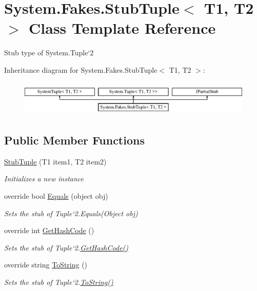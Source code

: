 \hypertarget{class_system_1_1_fakes_1_1_stub_tuple_3_01_t1_00_01_t2_01_4}{\section{System.\-Fakes.\-Stub\-Tuple$<$ T1, T2 $>$ Class Template Reference}
\label{class_system_1_1_fakes_1_1_stub_tuple_3_01_t1_00_01_t2_01_4}
}


Stub type of System.\-Tuple`2 


Inheritance diagram for System.\-Fakes.\-Stub\-Tuple$<$ T1, T2 $>$\-:\begin{figure}[H]
\begin{center}
\leavevmode
\includegraphics[height=1.704718cm]{class_system_1_1_fakes_1_1_stub_tuple_3_01_t1_00_01_t2_01_4}
\end{center}
\end{figure}
\subsection*{Public Member Functions}
\begin{DoxyCompactItemize}
\item 
\hyperlink{class_system_1_1_fakes_1_1_stub_tuple_3_01_t1_00_01_t2_01_4_a96c73b068f3b8f4f797e172dc0246e2d}{Stub\-Tuple} (T1 item1, T2 item2)
\begin{DoxyCompactList}\small\item\em Initializes a new instance\end{DoxyCompactList}\item 
override bool \hyperlink{class_system_1_1_fakes_1_1_stub_tuple_3_01_t1_00_01_t2_01_4_a41148edbc3779f77dd6fea37d72a7d82}{Equals} (object obj)
\begin{DoxyCompactList}\small\item\em Sets the stub of Tuple`2.Equals(\-Object obj)\end{DoxyCompactList}\item 
override int \hyperlink{class_system_1_1_fakes_1_1_stub_tuple_3_01_t1_00_01_t2_01_4_ac97951511d2e14d82747dca526c23211}{Get\-Hash\-Code} ()
\begin{DoxyCompactList}\small\item\em Sets the stub of Tuple`2.\hyperlink{class_system_1_1_fakes_1_1_stub_tuple_3_01_t1_00_01_t2_01_4_ac97951511d2e14d82747dca526c23211}{Get\-Hash\-Code()}\end{DoxyCompactList}\item 
override string \hyperlink{class_system_1_1_fakes_1_1_stub_tuple_3_01_t1_00_01_t2_01_4_ad032f05310dff24e268b8848adbe8d16}{To\-String} ()
\begin{DoxyCompactList}\small\item\em Sets the stub of Tuple`2.\hyperlink{class_system_1_1_fakes_1_1_stub_tuple_3_01_t1_00_01_t2_01_4_ad032f05310dff24e268b8848adbe8d16}{To\-String()}\end{DoxyCompactList}\end{DoxyCompactItemize}
